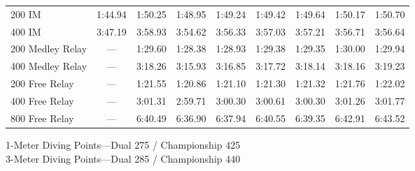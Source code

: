 \begin{table}[htbp]
\begin{tabularx}{\textwidth}{lccrrrrrr}
\rowcolor{teamprimary!8}
200 IM & 1:44.94 & 1:50.25 & 1:48.95 & 1:49.24 & 1:49.42 & 1:49.64 & 1:50.17 & 1:50.70 \\
\rowcolor{teamsecondary!12}
400 IM & 3:47.19 & 3:58.93 & 3:54.62 & 3:56.33 & 3:57.03 & 3:57.21 & 3:56.71 & 3:56.64 \\
\rowcolor{teamprimary!8}
200 Medley Relay & --- & 1:29.60 & 1:28.38 & 1:28.93 & 1:29.38 & 1:29.35 & 1:30.00 & 1:29.94 \\
\rowcolor{teamsecondary!12}
400 Medley Relay & --- & 3:18.26 & 3:15.93 & 3:16.85 & 3:17.72 & 3:18.14 & 3:18.16 & 3:19.23 \\
\rowcolor{teamprimary!8}
200 Free Relay & --- & 1:21.55 & 1:20.86 & 1:21.10 & 1:21.30 & 1:21.32 & 1:21.76 & 1:22.02 \\
\rowcolor{teamsecondary!12}
400 Free Relay & --- & 3:01.31 & 2:59.71 & 3:00.30 & 3:00.61 & 3:00.30 & 3:01.26 & 3:01.77 \\
\rowcolor{teamprimary!8}
800 Free Relay & --- & 6:40.49 & 6:36.90 & 6:37.94 & 6:40.55 & 6:39.35 & 6:42.91 & 6:43.52 \\
\bottomrule
\end{tabularx}

\vspace{0.5em}
\small{1-Meter Diving Points—Dual 275 / Championship 425 \\
3-Meter Diving Points—Dual 285 / Championship 440}
\end{table}

